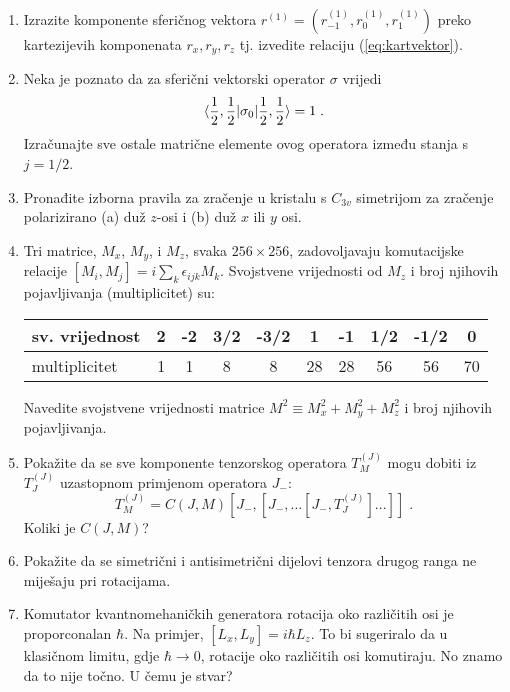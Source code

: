 \begin{enumerate}[label=\arabic{chapter}.\arabic*.]
\item
Izrazite komponente sferičnog vektora $r^{(1)} = (r^{(1)}_{-1}, r^{(1)}_{0},
r^{(1)}_{1})$ preko kartezijevih komponenata $r_x, r_y, r_z$ tj. izvedite
relaciju (\ref{eq:kartvektor}).

\item Neka je poznato da za sferični vektorski operator $\sigma$ vrijedi
\[  \langle \frac{1}{2}, \frac{1}{2} | \sigma_0 | \frac{1}{2}, \frac{1}{2} \rangle = 1 \;. \]
Izračunajte sve ostale matrične elemente ovog operatora između stanja
s $j = 1/2$.

\item Pronađite izborna pravila za zračenje u kristalu s $C_{3v}$
simetrijom za zračenje polarizirano (a) duž $z$-osi i (b) duž
$x$ ili $y$ osi. 

\item 
Tri matrice, $M_x$, $M_y$, i $M_z$, svaka $256\times 256$, zadovoljavaju
komutacijske relacije $[M_i, M_j] = i \sum_{k} \epsilon_{ijk} M_k$.
Svojstvene vrijednosti od $M_z$ i broj njihovih pojavljivanja (multiplicitet) su:
\begin{center}
\begin{tabular}[h]{l|ccccccccc}
\hline
sv. vrijednost & 2 & -2 & 3/2 & -3/2 & 1 & -1 & 1/2 & -1/2 & 0 \\ \hline
multiplicitet & 1 & 1 & 8 & 8 & 28 & 28 & 56 & 56 & 70 \\ \hline
\end{tabular}
\end{center}
Navedite svojstvene vrijednosti matrice $M^2 \equiv M_{x}^2 + M_{y}^2 + M_{z}^2$
i broj njihovih pojavljivanja.

\item Pokažite da se sve komponente tenzorskog operatora 
$T^{(J)}_M$ mogu dobiti iz $T^{(J)}_J$ uzastopnom primjenom operatora $J_-$:
\[ T^{(J)}_M = C(J,M) [J_-, [J_-, \dots [J_-, T^{(J)}_J]. . .]] \;. \]
Koliki je $C(J,M)$?

\item \label{zad:antisim} Pokažite da se simetrični i antisimetrični
dijelovi tenzora drugog ranga ne miješaju pri rotacijama.

\item Komutator kvantnomehaničkih generatora rotacija oko različitih osi
    je proporconalan $\hbar$. Na primjer, $[L_x, L_y] = i\hbar L_z$. To
    bi sugeriralo da u klasičnom limitu, gdje $\hbar\to 0$, rotacije
    oko različitih osi komutiraju. No znamo da to nije točno.
    U čemu je stvar?

\end{enumerate}

